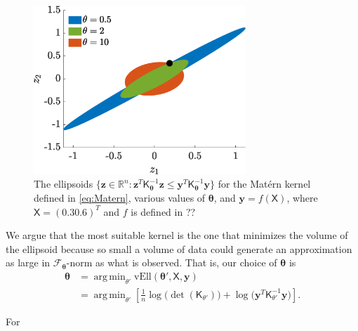 \documentclass[]{mcom-l}
\theoremstyle{remark}
\newcommand{\vEll}{\text{vEll}}
\DeclareMathOperator*{\argmin}{arg\,min}
\newcommand{\reals}{{\mathbb{R}}}
\newcommand{\mK}{\mathsf{K}}
\newcommand{\mX}{\mathsf{X}}
\newcommand{\by}{{\boldsymbol{y}}}
\newcommand{\bz}{{\boldsymbol{z}}}
\newcommand{\btheta}{{\boldsymbol{\theta}}}
\newcommand{\calf}{{\mathcal{F}}}
\begin{document}
\begin{figure}[H]
	\centering
	\includegraphics[width = 8cm]{ProgramsImages/ellipsesplot.eps}
	\caption{The ellipsoids $\{ \bz \in \reals^n : \bz^T \mK_\btheta^{-1} \bz \le \by^T \mK_\btheta^{-1} \by  \bigr \}$ for the Mat\'ern kernel defined in \eqref{eq:Matern}, various values of $\btheta$, and $\by = f(\mX)$, where $\mX = (0.3 0.6)^T$ and $f$ is defined in ?? \label{fig:ellipPlot}}
\end{figure}

We argue that the most suitable kernel is the one that minimizes the volume of the ellipsoid because so small a volume of data could generate an approximation as large in $\calf_{\btheta}$-norm as what is observed.  That is, our choice of $\btheta$ is
\begin{align} \label{eq:thetEB}
\btheta & =  \argmin_{\theta'}  \vEll(\btheta' ,\mX,\by) \\
\nonumber
& = \argmin_{\theta'}  \left[\frac 1n \log \bigl( \det(\mK_{\theta'}) \bigr) + \log \bigl ( \by^T \mK_{\theta'}^{-1} \by \bigr)\right].
\end{align}

For 
\end{document}
